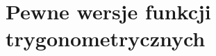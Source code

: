 \documentclass[a4paper,11pt]{article}
\numberwithin{equation}{section}
\begin{document}






























\section{Pewne wersje funkcji trygonometrycznych}

\label{sec:Funkcje-trygonometryczne}
\end{document}
